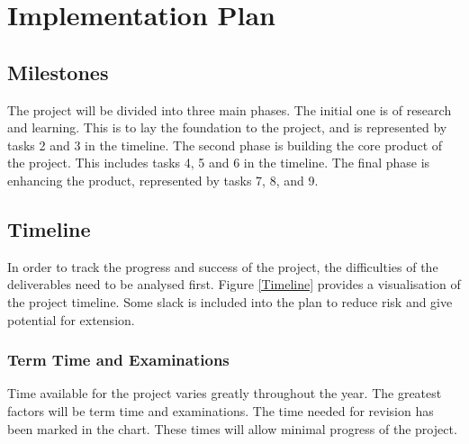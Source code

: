 \section{Implementation Plan}


\subsection{Milestones}
The project will be divided into three main phases.
The initial one is of research and learning.
This is to lay the foundation to the project, and is represented by tasks 2 and
3 in the timeline.
The second phase is building the core product of the project.
This includes tasks 4, 5 and 6 in the timeline.
The final phase is enhancing the product, represented by tasks 7, 8, and 9.

\subsection{Timeline}
\begin{figure*}[!b]
  \centering
  
  \caption{Project Timeline}
  \label{Timeline}
\end{figure*}

In order to track the progress and success of the project, the difficulties
of the deliverables need to be analysed first.
Figure \ref{Timeline} provides a visualisation of the project timeline.
Some slack is included into the plan to reduce risk and give potential for
extension.


\subsubsection{\textbf{Term Time and Examinations}}
Time available for the project varies greatly throughout the year.
The greatest factors will be term time and examinations.
The time needed for revision has been marked in the chart.
These times will allow minimal progress of the project.

